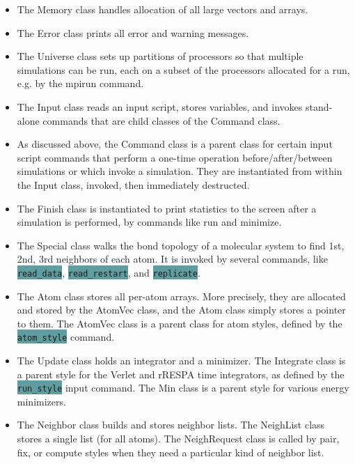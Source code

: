 \documentclass{article}
\newcommand{\code}[1]{\colorbox{cadetblue}{\color{white}\texttt{#1}}}
\begin{document}
\begin{itemize}

\item The Memory class handles allocation of all large vectors and
  arrays.

\item The Error class prints all error and warning messages.

\item The Universe class sets up partitions of processors so that
  multiple simulations can be run, each on a subset of the processors
  allocated for a run, e.g. by the mpirun command.

\item The Input class reads an input script, stores variables, and
  invokes stand-alone commands that are child classes of the Command
  class.

\item As discussed above, the Command class is a parent class for
  certain input script commands that perform a one-time operation
  before/after/between simulations or which invoke a simulation.  They
  are instantiated from within the Input class, invoked, then
  immediately destructed.

\item The Finish class is instantiated to print statistics to the
  screen after a simulation is performed, by commands like run and
  minimize.

\item The Special class walks the bond topology of a molecular system to find
  1st, 2nd, 3rd neighbors of each atom. It is invoked by several commands, like
  \code{read\_data}, \code{read\_restart}, and \code{replicate}.

\item The Atom class stores all per-atom arrays.  More precisely, they
  are allocated and stored by the AtomVec class, and the Atom class
  simply stores a pointer to them.  The AtomVec class is a parent
  class for atom styles, defined by the \code{atom\_style} command.

\item The Update class holds an integrator and a minimizer.  The
  Integrate class is a parent style for the Verlet and rRESPA time
  integrators, as defined by the \code{run\_style} input command.  The Min
  class is a parent style for various energy minimizers.

\item The Neighbor class builds and stores neighbor lists.  The
  NeighList class stores a single list (for all atoms).  The
  NeighRequest class is called by pair, fix, or compute styles when
  they need a particular kind of neighbor list.


\end{itemize}
\end{document}

